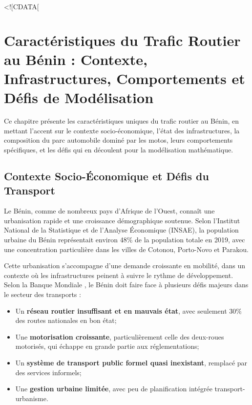 <![CDATA[%
\chapter{Caractéristiques du Trafic Routier au Bénin : Contexte, Infrastructures, Comportements et Défis de Modélisation}
\label{chap:specificites_benin}

Ce chapitre présente les caractéristiques uniques du trafic routier au Bénin, en mettant l'accent sur le contexte socio-économique, l'état des infrastructures, la composition du parc automobile dominé par les motos, leurs comportements spécifiques, et les défis qui en découlent pour la modélisation mathématique.

\section{Contexte Socio-Économique et Défis du Transport}
\label{sec:contexte_socio_economique}

Le Bénin, comme de nombreux pays d'Afrique de l'Ouest, connaît une urbanisation rapide et une croissance démographique soutenue. Selon l'Institut National de la Statistique et de l'Analyse Économique (INSAE), la population urbaine du Bénin représentait environ 48\% de la population totale en 2019, avec une concentration particulière dans les villes de Cotonou, Porto-Novo et Parakou.

Cette urbanisation s'accompagne d'une demande croissante en mobilité, dans un contexte où les infrastructures peinent à suivre le rythme de développement. Selon la Banque Mondiale \cite{worldbank2019benin}, le Bénin doit faire face à plusieurs défis majeurs dans le secteur des transports :

\begin{itemize}
    \item Un \textbf{réseau routier insuffisant et en mauvais état}, avec seulement 30\% des routes nationales en bon état;
    \item Une \textbf{motorisation croissante}, particulièrement celle des deux-roues motorisés, qui échappe en grande partie aux réglementations;
    \item Un \textbf{système de transport public formel quasi inexistant}, remplacé par des services informels;
    \item Une \textbf{gestion urbaine limitée}, avec peu de planification intégrée transport-urbanisme.
\end{itemize}

